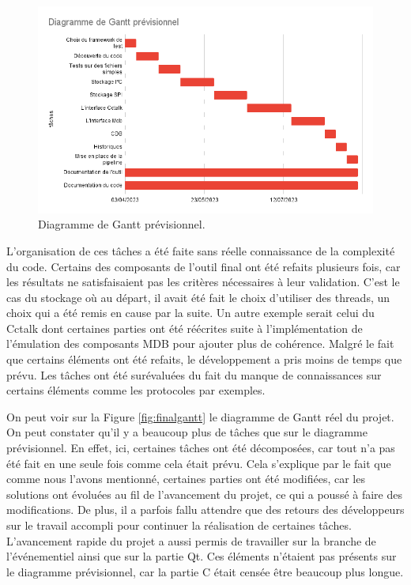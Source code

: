 \documentclass[a4paper]{article}
\begin{document}
\begin{figure}[h!]
  \begin{center}
  \includegraphics[scale=0.6]{./img/expected-gantt.png}
  \caption{Diagramme de Gantt prévisionnel.}
  \end{center}
  \label{fig:expectedgantt}
\end{figure}

L'organisation de ces tâches a été faite sans réelle connaissance de la
complexité du code. Certains des composants de l'outil final ont été refaits
plusieurs fois, car les résultats ne satisfaisaient pas les critères nécessaires
à leur validation. C'est le cas du stockage où au départ, il avait été fait le
choix d'utiliser des threads, un choix qui a été remis en cause par la suite. Un
autre exemple serait celui du Cctalk dont certaines parties ont été réécrites
suite à l'implémentation de l'émulation des composants MDB pour ajouter plus de
cohérence. Malgré le fait que certains éléments ont été refaits, le
développement a pris moins de temps que prévu. Les tâches ont été surévaluées du
fait du manque de connaissances sur certains éléments comme les protocoles par
exemples.

On peut voir sur la Figure \ref{fig:finalgantt} le diagramme de Gantt réel du
projet. On peut constater qu'il y a beaucoup plus de tâches que sur le diagramme
prévisionnel. En effet, ici, certaines tâches ont été décomposées, car tout n'a
pas été fait en une seule fois comme cela était prévu. Cela s'explique par le
fait que comme nous l'avons mentionné, certaines parties ont été modifiées, car
les solutions ont évoluées au fil de l'avancement du projet, ce qui a poussé à
faire des modifications. De plus, il a parfois fallu attendre que des retours
des développeurs sur le travail accompli pour continuer la réalisation de
certaines tâches. L'avancement rapide du projet a aussi permis de travailler sur
la branche de l'événementiel ainsi que sur la partie Qt. Ces éléments
n'étaient pas présents sur le diagramme prévisionnel, car la partie C était
censée être beaucoup plus longue.
\end{document}
